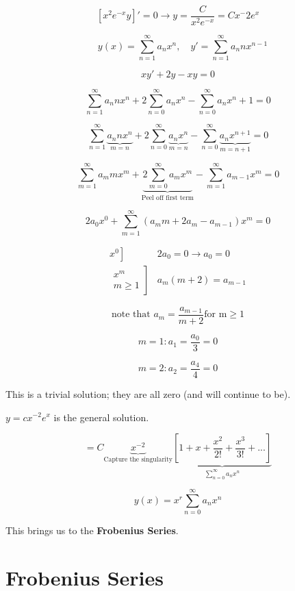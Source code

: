 \documentclass{article}
\begin{document}
$$\left[x^2 e^{-x} y \right]' = 0 \rightarrow y = \frac{C}{x^2 e^{-x}} = C x^-2 e^x$$


$$\quad y(x) = \sum_{n = 1}^\infty a_n x^n, \quad y' = \sum_{n=1}^\infty a_n n x^{n-1}$$

$$xy' + 2y - xy = 0$$

$$\sum_{n = 1}^{\infty} a_n n x^n + 2 \sum_{n = 0}^{\infty} a_n x^n - \sum_{n = 0}^{\infty} a_n x^n+1 = 0$$


$$\sum_{n=1}^\infty \underbrace{a_n n x^n}_{m=n} + 2 \sum_{n=0}^\infty \underbrace{a_n x^n}_{m=n} - \sum_{n=0}^\infty \underbrace{a_n x^{n+1}}_{m = n+1} = 0$$

$$\sum_{m=1}^\infty a_m m x^m + \underbrace{2 \sum_{m=0}^\infty a_m x^m}_{\text{Peel off first term}} - \sum_{m=1}^\infty a_{m-1} x^m = 0$$

$$2 a_0 x^0 + \sum_{m=1}^\infty \left(a_m m + 2 a_m - a_{m-1} \right) x^m = 0$$

$$\begin{matrix} \left. x^0 \right] & 2 a_0 = 0 \longrightarrow a_0 = 0 \\
\left. \begin{matrix} x^m \\ m \geq 1 \end{matrix} \right] & a_m (m+2) = a_{m-1} \end{matrix}$$

$$\text{note that } a_m = \frac{a_{m-1}}{m+2} \text{for m} \geq 1$$

$$m = 1: a_1 = \frac{a_0}{3} = 0$$

$$m = 2: a_2 = \frac{a_4}{4} = 0$$

This is a trivial solution; they are all zero (and will continue to be). 

$y = c x^{-2} e^x$ is the general solution. 

$$ = C \underbrace{x^{-2}}_{\text{Capture the singularity}} \underbrace{\left[ 1 + x + \frac{x^2}{2!} + \frac{x^3}{3!} + ... \right]}_{\sum_{n = 0}^{\infty} a_n x^n}$$

$$ y(x) = x^r \sum_{n = 0}^{\infty} a_n x^n$$

This brings us to the \textbf{Frobenius Series}. 

\section{Frobenius Series}
\end{document}
